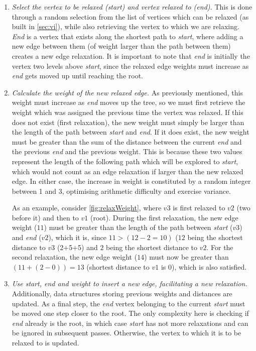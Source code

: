 \documentclass{l4proj}
\begin{document}
\begin{enumerate}[i]
	\item
	\emph{Select the vertex to be relaxed (start) and vertex relaxed to (end).} This is done through a random selection from the list of vertices which can be relaxed (as built in \autoref{sec:vi}), while also retrieving the vertex to which we are relaxing. \emph{End} is a vertex that exists along the shortest path to \emph{start}, where adding a new edge between them (of weight larger than the path between them) creates a new edge relaxation. It is important to note that \emph{end} is initially the vertex two levels above \emph{start}, since the relaxed edge weights must increase as \emph{end} gets moved up until reaching the root.

	\item
	\emph{Calculate the weight of the new relaxed edge.} As previously mentioned, this weight must increase as \emph{end} moves up the tree, so we must first retrieve the weight which was assigned the previous time the vertex was relaxed. If this does not exist (first relaxation), the new weight must simply be larger than the length of the path between \emph{start} and \emph{end}. If it does exist, the new weight must be greater than the sum of the distance between the current \emph{end} and the previous \emph{end} and the previous weight. This is because these two values represent the length of the following path which will be explored to \emph{start}, which would not count as an edge relaxation if larger than the new relaxed edge. In either case, the increase in weight is constituted by a random integer between 1 and 3, optimising arithmetic difficulty and exercise variance.

As an example, consider \autoref{fig:relaxWeight}, where $v3$ is first relaxed to $v2$ (two before it) and then to $v1$ (root). During the first relaxation, the new edge weight ($11$) must be greater than the length of the path between \emph{start} ($v3$) and \emph{end} ($v2$), which it is, since $11 > (12 - 2 = 10)$ ($12$ being the shortest distance to $v3$ (2+5+5) and $2$ being the shortest distance to $v2$. For the second relaxation, the new edge weight ($14$) must now be greater than $(11 + (2-0)) = 13$ (shortest distance to $v1$ is $0$), which is also satisfied.

\item
\emph{Use start, end and weight to insert a new edge, facilitating a new relaxation.} Additionally, data structures storing previous weights and distances are updated. As a final step, the \emph{end} vertex belonging to the current \emph{start} must be moved one step closer to the root. The only complexity here is checking if \emph{end} already is the root, in which case \emph{start} has not more relaxations and can be ignored in subsequent passes. Otherwise, the vertex to which it is to be relaxed to is updated.
\end{enumerate}
\end{document}
